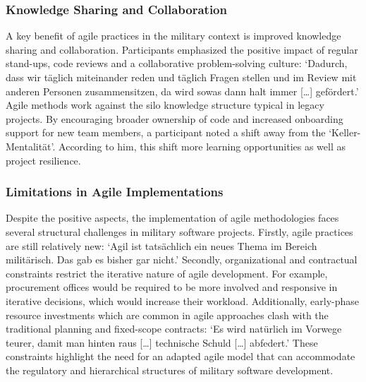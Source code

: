 \subsubsection{Knowledge Sharing and Collaboration}
A key benefit of agile practices in the military context is improved knowledge sharing and collaboration. Participants emphasized the positive impact of regular stand-ups, code reviews and a collaborative problem-solving culture: `Dadurch, dass wir täglich miteinander reden und täglich Fragen stellen und im Review mit anderen 
Personen zusammensitzen, da wird sowas dann halt immer [\ldots] gefördert.' Agile methods work against the silo knowledge structure typical in legacy projects. By encouraging broader ownership of code and increased onboarding support for new team members, a participant noted a shift away from the `Keller-Mentalität'. According to him,
this shift more learning opportunities as well as project resilience.\\

\subsubsection{Limitations in Agile Implementations}
Despite the positive aspects, the implementation of agile methodologies faces several structural challenges in military software projects. Firstly, agile practices are still relatively new: `Agil ist tatsächlich ein neues Thema im Bereich militärisch. Das gab es bisher gar nicht.'
Secondly, organizational and contractual constraints restrict the iterative nature of agile development. For example, procurement offices would be required to be more involved and responsive in iterative decisions, which would increase their workload. Additionally, early-phase resource investments which are common in agile approaches
clash with the traditional planning and fixed-scope contracts: `Es wird natürlich im Vorwege teurer, damit man hinten raus [\ldots] technische Schuld [\ldots] abfedert.' These constraints highlight the need for an adapted agile model that can accommodate the regulatory and hierarchical structures of military software development.\\

